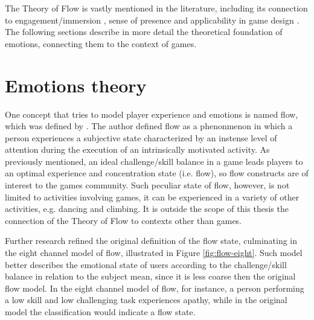 The Theory of Flow is vastly mentioned in the literature, including its connection to engagement/immersion \parencite{brown2004grounded}, sense of presence \parencite{weibel2011immersion} and applicability in game design \parencite{cruz2017player, sweetser2005gameflow}. The following sections describe in more detail the theoretical foundation of emotions, connecting them to the context of games.

\section{Emotions theory}

One concept that tries to model player experience and emotions is named flow, which was defined by \textcite{csikszentmihalyi1991flow}. The author defined flow as a phenonmenon in which a person experiences a subjective state characterized by an instense level of attention during the execution of an intrinsically motivated activity. As previously mentioned, an ideal challenge/skill balance in a game leads players to an optimal experience and concentration state (i.e. flow), so flow constructs are of interest to the games community. Such peculiar state of flow, however, is not limited to activities involving games, it can be experienced in a variety of other activities, e.g. dancing and climbing. It is outside the scope of this thesis the connection of the Theory of Flow to contexts other than games.

Further research \parencite{nakamura2014concept} refined the original definition of the flow state, culminating in the eight channel model of flow, illustrated in Figure \ref{fig:flow-eight}. Such model better describes the emotional state of users according to the challenge/skill balance in relation to the subject mean, since it is less coarse then the original flow model. In the eight channel model of flow, for instance, a person performing a low skill and low challenging task experiences apathy, while in the original model the classification would indicate a flow state.

